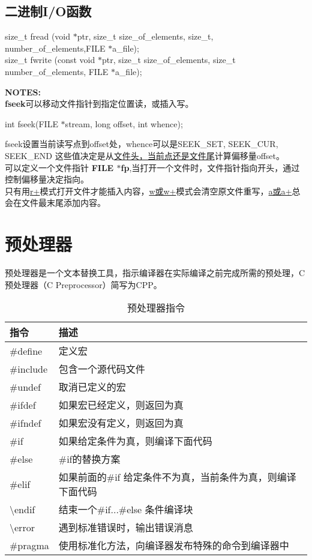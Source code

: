\documentclass[UTF8]{ctexart}
\begin{document}
			\subsection{二进制I/O函数}
			\begin{framed}
				size\_t fread (void $*$ptr, size\_t size\_of\_elements, size\_t, number\_of\_elements,FILE $*$a\_file);\\
				size\_t fwrite (const void $*$ptr, size\_t size\_of\_elements, size\_t number\_of\_elements, FILE $*$a\_file);
			\end{framed}
			\begin{framed}
				\textbf{NOTES:}\\
				\textbf{fseek}可以移动文件指针到指定位置读，或插入写。
				\begin{framed}
					int fseek(FILE $*$stream, long offset, int whence);
				\end{framed}
				fseek设置当前读写点到offset处，whence可以是SEEK\_SET, SEEK\_CUR, SEEK\_END 这些值决定是从\underline{文件头，当前点还是文件尾}计算偏移量offset。\\
				可以定义一个文件指针 \textbf{FILE $*$fp},当打开一个文件时，文件指针指向开头，通过控制偏移量决定指向。\\
				只有用\underline{r+}模式打开文件才能插入内容，\underline{w或w+}模式会清空原文件重写，\underline{a或a+}总会在文件最末尾添加内容。
			\end{framed}

			\clearpage
			\section{预处理器}
			预处理器是一个文本替换工具，指示编译器在实际编译之前完成所需的预处理，C 预处理器（C Preprocessor）简写为CPP。
			\begin{table}
				\caption{预处理器指令}
				\begin{tabular}[]{l|l}
					\toprule
					指令&描述\\
					\midrule
					\#define&定义宏\\
					\#include&包含一个源代码文件\\
					\#undef&取消已定义的宏\\
					\#ifdef&如果宏已经定义，则返回为真\\
					\#ifndef&如果宏没有定义，则返回为真\\
					\#if&如果给定条件为真，则编译下面代码\\
					\#else & \#if的替换方案\\
					\#elif & 如果前面的\#if 给定条件不为真，当前条件为真，则编译下面代码\\
					\textbackslash endif & 结束一个\#if...\#else 条件编译块\\
					\textbackslash error & 遇到标准错误时，输出错误消息\\
					\#pragma & 使用标准化方法，向编译器发布特殊的命令到编译器中\\
					\bottomrule
				\end{tabular}
			\end{table}
\end{document}
